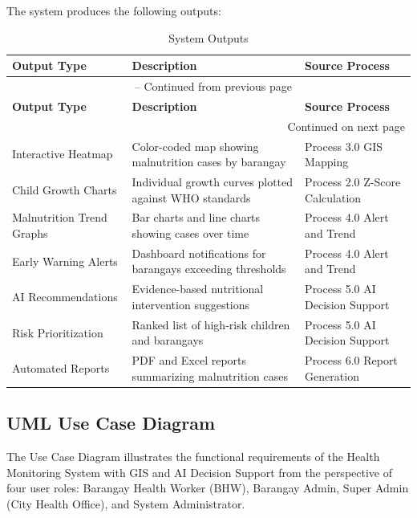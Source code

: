 \documentclass[12pt, a4paper]{report}
\begin{document}
The system produces the following outputs:
\vspace{0.3cm}
\begin{longtable}{p{3cm} p{8cm} p{3cm}}
    \caption{System Outputs} \label{tab:system_outputs} \\
    \toprule
    \textbf{Output Type} & \textbf{Description} & \textbf{Source Process} \\
    \midrule
    \endfirsthead
    \multicolumn{3}{c}{{\tablename\ \thetable{} -- Continued from previous page}} \\
    \toprule
    \textbf{Output Type} & \textbf{Description} & \textbf{Source Process} \\
    \midrule
    \endhead
    \midrule
    \multicolumn{3}{r}{{Continued on next page}} \\
    \endfoot
    \bottomrule
    \endlastfoot
    Interactive Heatmap & Color-coded map showing malnutrition cases by barangay & Process 3.0 GIS Mapping \\
    \addlinespace
    Child Growth Charts & Individual growth curves plotted against WHO standards & Process 2.0 Z-Score Calculation \\
    \addlinespace
    Malnutrition Trend Graphs & Bar charts and line charts showing cases over time & Process 4.0 Alert and Trend \\
    \addlinespace
    Early Warning Alerts & Dashboard notifications for barangays exceeding thresholds & Process 4.0 Alert and Trend \\
    \addlinespace
    AI Recommendations & Evidence-based nutritional intervention suggestions & Process 5.0 AI Decision Support \\
    \addlinespace
    Risk Prioritization & Ranked list of high-risk children and barangays & Process 5.0 AI Decision Support \\
    \addlinespace
    Automated Reports & PDF and Excel reports summarizing malnutrition cases & Process 6.0 Report Generation \\
\end{longtable}
\vspace{0.3cm}

\subsection{UML Use Case Diagram}
\label{subsec:usecase}
The Use Case Diagram illustrates the functional requirements of the Health Monitoring System with GIS and AI Decision Support from the perspective of four user roles: Barangay Health Worker (BHW), Barangay Admin, Super Admin (City Health Office), and System Administrator.
\end{document}
